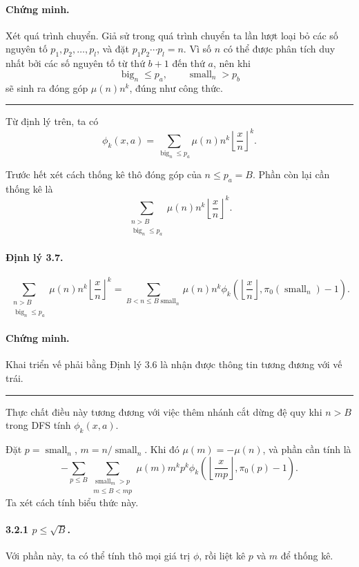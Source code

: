 \documentclass[11pt]{article}
\newcommand{\qedmark}{\hfill\rule{0.7ex}{0.7ex}}
\begin{document}
\paragraph{Chứng minh.}
Xét quá trình chuyển. Giả sử trong quá trình chuyển ta lần lượt loại bỏ các số
nguyên tố \(p_1,p_2,\ldots,p_l\), và đặt \(p_1p_2\cdots p_l=n\). Vì số \(n\)
có thể được phân tích duy nhất bởi các số nguyên tố từ thứ \(b+1\) đến thứ
\(a\), nên khi
\[
  \operatorname{big}_n\le p_a,\qquad \operatorname{small}_n>p_b
\]
sẽ sinh ra đóng góp \(\mu(n)n^k\), đúng như công thức. \qedmark

Từ định lý trên, ta có
\[
  \phi_k(x,a)=
  \sum_{\operatorname{big}_n\le p_a}
  \mu(n)n^k\left\lfloor\frac{x}{n}\right\rfloor^k .
\]

Trước hết xét cách thống kê thô đóng góp của \(n\le p_a=B\). Phần còn lại cần
thống kê là
\[
  \sum_{\substack{n>B\\\operatorname{big}_n\le p_a}}
  \mu(n)n^k\left\lfloor\frac{x}{n}\right\rfloor^k .
\]

\paragraph{Định lý 3.7.}
\[
\sum_{\substack{n>B\\\operatorname{big}_n\le p_a}}
\mu(n)n^k\left\lfloor\frac{x}{n}\right\rfloor^k
=
\sum_{B<n\le B\operatorname{small}_n}
\mu(n)n^k
\phi_k\left(\left\lfloor\frac{x}{n}\right\rfloor,
\pi_0(\operatorname{small}_n)-1\right).
\]

\paragraph{Chứng minh.}
Khai triển vế phải bằng Định lý 3.6 là nhận được thông tin tương đương với vế
trái. \qedmark

Thực chất điều này tương đương với việc thêm nhánh cắt dừng đệ quy khi
\(n>B\) trong DFS tính \(\phi_k(x,a)\).

Đặt \(p=\operatorname{small}_n\), \(m=n/\operatorname{small}_n\). Khi đó
\(\mu(m)=-\mu(n)\), và phần cần tính là
\[
  -\sum_{p\le B}
  \sum_{\substack{\operatorname{small}_m>p\\m\le B<mp}}
  \mu(m)m^kp^k
  \phi_k\left(\left\lfloor\frac{x}{mp}\right\rfloor,\pi_0(p)-1\right).
\]
Ta xét cách tính biểu thức này.

\paragraph{3.2.1 \(p\le\sqrt B\).}
Với phần này, ta có thể tính thô mọi giá trị \(\phi\), rồi liệt kê \(p\) và
\(m\) để thống kê.
\end{document}
